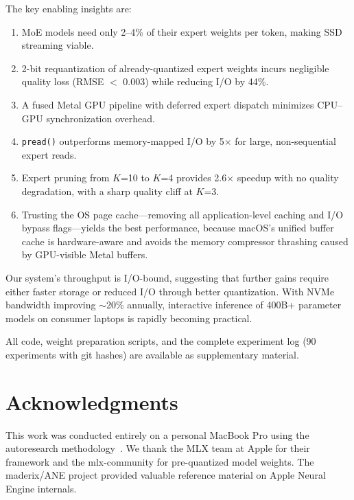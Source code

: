 \documentclass[11pt,twocolumn]{article}
\begin{document}
The key enabling insights are:
\begin{enumerate}[leftmargin=*,itemsep=2pt]
    \item MoE models need only 2--4\% of their expert weights per token, making SSD streaming viable.
    \item 2-bit requantization of already-quantized expert weights incurs negligible quality loss (RMSE $<$ 0.003) while reducing I/O by 44\%.
    \item A fused Metal GPU pipeline with deferred expert dispatch minimizes CPU--GPU synchronization overhead.
    \item \texttt{pread()} outperforms memory-mapped I/O by 5$\times$ for large, non-sequential expert reads.
    \item Expert pruning from $K$=10 to $K$=4 provides 2.6$\times$ speedup with no quality degradation, with a sharp quality cliff at $K$=3.
    \item Trusting the OS page cache---removing all application-level caching and I/O bypass flags---yields the best performance, because macOS's unified buffer cache is hardware-aware and avoids the memory compressor thrashing caused by GPU-visible Metal buffers.
\end{enumerate}

Our system's throughput is I/O-bound, suggesting that further gains require either faster storage or reduced I/O through better quantization.
With NVMe bandwidth improving $\sim$20\% annually, interactive inference of 400B+ parameter models on consumer laptops is rapidly becoming practical.

All code, weight preparation scripts, and the complete experiment log (90 experiments with git hashes) are available as supplementary material.

\section*{Acknowledgments}
This work was conducted entirely on a personal MacBook Pro using the autoresearch methodology~\cite{karpathy2025autoresearch}.
We thank the MLX team at Apple for their framework and the mlx-community for pre-quantized model weights.
The maderix/ANE project provided valuable reference material on Apple Neural Engine internals.
\end{document}
